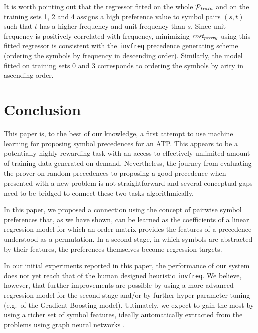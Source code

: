 \documentclass[a4paper]{easychair}
\begin{document}
%	
%	

It is worth pointing out that the regressor fitted on the whole \(\mathcal{P}_{\mathit{train}}\)
and on the training sets 1, 2 and 4
assigns a high preference value to symbol pairs \((s, t)\)
such that \(t\) has a higher frequency and unit frequency than \(s\).
Since unit frequency is positively correlated with frequency,
minimizing \(\operatorname{\mathit{cost_{proxy}}}\) using this fitted regressor
is consistent with the \texttt{invfreq} precedence generating scheme
(ordering the symbols by frequency in descending order).
Similarly, the model fitted on training sets 0 and 3 corresponds to ordering the symbols by arity in ascending order.

\section{Conclusion}

This paper is, to the best of our knowledge, a first attempt to use machine learning for proposing symbol precedences for an ATP. 
This appears to be a potentially highly rewarding task with an access to effectively unlimited amount of training data generated on demand.
Nevertheless, the journey from evaluating the prover on random precedences to proposing a good precedence when presented 
with a new problem is not straightforward and several conceptual gaps need to be bridged to connect these two tasks algorithmically. 

In this paper, we proposed a connection using the concept of pairwise symbol preferences that, as we have shown,
can be learned as the coefficients of a linear regression model for 
which an order matrix provides the features of a precedence understood as a permutation. 
In a second stage, in which symbols are abstracted by their features, the preferences themselves become regression targets.

In our initial experiments reported in this paper, the performance of our system does not
yet reach that of the human designed heuristic \texttt{invfreq}. We believe, however,
that further improvements are possible by using a more advanced regression model for the second stage
and/or by further hyper-parameter tuning (e.g.~of the Gradient Boosting model).
Ultimately, we expect to gain the most by using a richer set of symbol features,
ideally automatically extracted from the problems using graph neural networks \cite{Wu2019}. 




\end{document}
